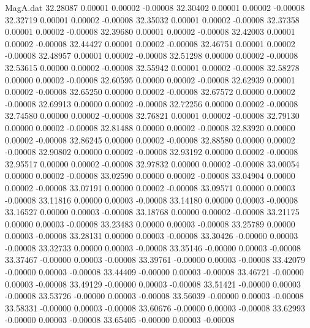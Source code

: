 \begin{filecontents}{MagA.dat}
  32.28087    0.00001    0.00002   -0.00008
  32.30402    0.00001    0.00002   -0.00008
  32.32719    0.00001    0.00002   -0.00008
  32.35032    0.00001    0.00002   -0.00008
  32.37358    0.00001    0.00002   -0.00008
  32.39680    0.00001    0.00002   -0.00008
  32.42003    0.00001    0.00002   -0.00008
  32.44427    0.00001    0.00002   -0.00008
  32.46751    0.00001    0.00002   -0.00008
  32.48957    0.00001    0.00002   -0.00008
  32.51298    0.00000    0.00002   -0.00008
  32.53615    0.00000    0.00002   -0.00008
  32.55942    0.00001    0.00002   -0.00008
  32.58278    0.00000    0.00002   -0.00008
  32.60595    0.00000    0.00002   -0.00008
  32.62939    0.00001    0.00002   -0.00008
  32.65250    0.00000    0.00002   -0.00008
  32.67572    0.00000    0.00002   -0.00008
  32.69913    0.00000    0.00002   -0.00008
  32.72256    0.00000    0.00002   -0.00008
  32.74580    0.00000    0.00002   -0.00008
  32.76821    0.00001    0.00002   -0.00008
  32.79130    0.00000    0.00002   -0.00008
  32.81488    0.00000    0.00002   -0.00008
  32.83920    0.00000    0.00002   -0.00008
  32.86245    0.00000    0.00002   -0.00008
  32.88580    0.00000    0.00002   -0.00008
  32.90802    0.00000    0.00002   -0.00008
  32.93192    0.00000    0.00002   -0.00008
  32.95517    0.00000    0.00002   -0.00008
  32.97832    0.00000    0.00002   -0.00008
  33.00054    0.00000    0.00002   -0.00008
  33.02590    0.00000    0.00002   -0.00008
  33.04904    0.00000    0.00002   -0.00008
  33.07191    0.00000    0.00002   -0.00008
  33.09571    0.00000    0.00003   -0.00008
  33.11816    0.00000    0.00003   -0.00008
  33.14180    0.00000    0.00003   -0.00008
  33.16527    0.00000    0.00003   -0.00008
  33.18768    0.00000    0.00002   -0.00008
  33.21175    0.00000    0.00003   -0.00008
  33.23483    0.00000    0.00003   -0.00008
  33.25789    0.00000    0.00003   -0.00008
  33.28131    0.00000    0.00003   -0.00008
  33.30426   -0.00000    0.00003   -0.00008
  33.32733    0.00000    0.00003   -0.00008
  33.35146   -0.00000    0.00003   -0.00008
  33.37467   -0.00000    0.00003   -0.00008
  33.39761   -0.00000    0.00003   -0.00008
  33.42079   -0.00000    0.00003   -0.00008
  33.44409   -0.00000    0.00003   -0.00008
  33.46721   -0.00000    0.00003   -0.00008
  33.49129   -0.00000    0.00003   -0.00008
  33.51421   -0.00000    0.00003   -0.00008
  33.53726   -0.00000    0.00003   -0.00008
  33.56039   -0.00000    0.00003   -0.00008
  33.58331   -0.00000    0.00003   -0.00008
  33.60676   -0.00000    0.00003   -0.00008
  33.62993   -0.00000    0.00003   -0.00008
  33.65405   -0.00000    0.00003   -0.00008

\end{filecontents}
